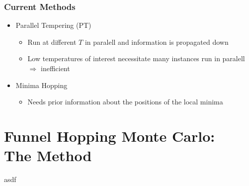 \documentclass{beamer}
\begin{document}
	\begin{frame}
		\frametitle{Current Methods}
		\begin{itemize}
			\item Parallel Tempering (PT)
			\begin{itemize}
				\item Run at different $T$ in paralell and information is propagated down
				\item Low temperatures of interest necessitate many instances run in paralell $\Rightarrow$ inefficient
			\end{itemize}
			\item Minima Hopping
			\begin{itemize}
				\item Needs prior information about the positions of the local minima
			\end{itemize}
		\end{itemize}
	\end{frame}

	\section{Funnel Hopping Monte Carlo:\\The Method}
	\begin{frame}
	asdf
	\end{frame}
















































\begin{frame}
  	\printbibliography[heading=bibintoc]

  \end{frame}
\end{document}
